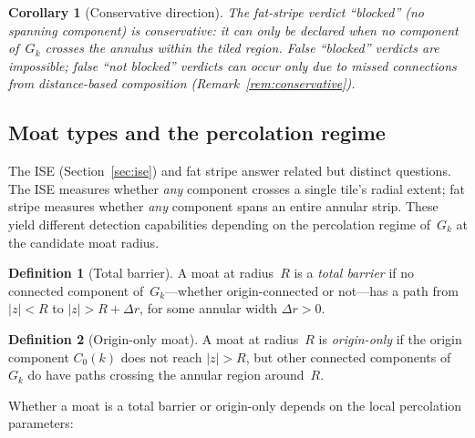 \documentclass[11pt,a4paper]{article}
\newcommand{\Gk}{G_k}
\theoremstyle{definition}
\newtheorem{definition}{Definition}[section]
\theoremstyle{plain}
\newtheorem{corollary}[theorem]{Corollary}
\theoremstyle{remark}
\begin{document}
\begin{corollary}[Conservative direction]\label{cor:fs-conservative}
The fat-stripe verdict ``blocked'' (no spanning component) is conservative: it can only be declared when no component of~$\Gk$ crosses the annulus within the tiled region.  False ``blocked'' verdicts are impossible; false ``not blocked'' verdicts can occur only due to missed connections from distance-based composition (Remark~\ref{rem:conservative}).
\end{corollary}

\subsection{Moat types and the percolation regime}

The ISE (Section~\ref{sec:ise}) and fat stripe answer related but distinct questions.  The ISE measures whether \emph{any} component crosses a single tile's radial extent; fat stripe measures whether \emph{any} component spans an entire annular strip.  These yield different detection capabilities depending on the percolation regime of~$\Gk$ at the candidate moat radius.

\begin{definition}[Total barrier]\label{def:total-barrier}
A moat at radius~$R$ is a \emph{total barrier} if no connected component of~$\Gk$---whether origin-connected or not---has a path from $|z| < R$ to $|z| > R + \Delta r$, for some annular width $\Delta r > 0$.
\end{definition}

\begin{definition}[Origin-only moat]\label{def:origin-only}
A moat at radius~$R$ is \emph{origin-only} if the origin component $C_0(k)$ does not reach $|z| > R$, but other connected components of~$\Gk$ do have paths crossing the annular region around~$R$.
\end{definition}

Whether a moat is a total barrier or origin-only depends on the local percolation parameters:
\end{document}
